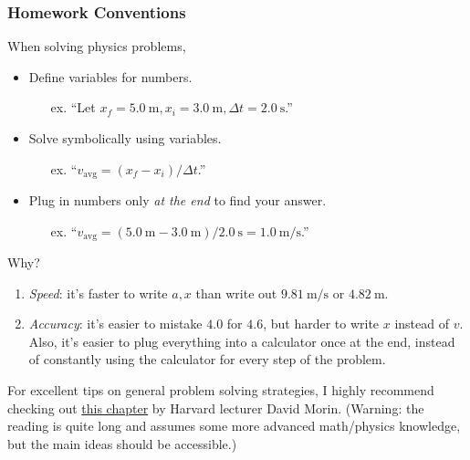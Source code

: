 \documentclass[20pt]{beamer}
\begin{document}
\begin{frame}
	\frametitle{Homework Conventions}
	When solving physics problems,
	\begin{itemize}
		\item Define variables for numbers.
		      \begin{itemize}
			      \item[ex.] ``Let $x_f = \SI{5.0}{\meter}, x_i = \SI{3.0}{\meter}, \Delta t = \SI{2.0}{\second}$.''
		      \end{itemize}
		\item Solve symbolically using variables.
		      \begin{itemize}
			      \item[ex.] ``$v_\mathrm{avg} = (x_f - x_i) / \Delta t$.''
		      \end{itemize}
		\item Plug in numbers only \textit{at the end} to find your answer.
		      \begin{itemize}
			      \item[ex.] ``$v_\mathrm{avg} = (\SI{5.0}{\meter} - \SI{3.0}{\meter}) / \SI{2.0}{\second} = \SI{1.0}{\meter/\second}$.''
		      \end{itemize}
	\end{itemize}
	\begin{alertblock}{Why?}
		\begin{enumerate}
			\item \textit{Speed}: it's faster to write $a, x$ than write out $\SI{9.81}{\meter/\second}$ or $\SI{4.82}{\meter}$.
			\item \textit{Accuracy}: it's easier to mistake $4.0$ for $4.6$, but harder to write $x$ instead of $v$. Also, it's easier to plug everything into a calculator once at the end, instead of constantly using the calculator for every step of the problem.
		\end{enumerate}
	\end{alertblock}
	For excellent tips on general problem solving strategies, I highly recommend checking out \href{https://bpb-us-e1.wpmucdn.com/sites.harvard.edu/dist/0/550/files/2023/11/problemschap1.pdf}{this chapter} by Harvard lecturer David Morin. (Warning: the reading is quite long and assumes some more advanced math/physics knowledge, but the main ideas should be accessible.)
\end{frame}
\end{document}
